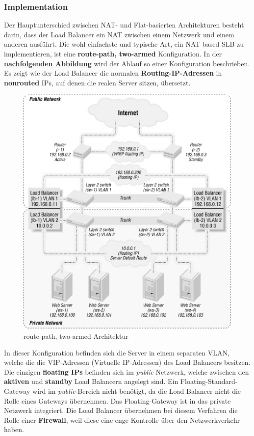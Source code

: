 \subsubsection{Implementation}
Der Hauptunterschied zwischen NAT- und Flat-basierten Architekturen besteht darin, dass der Load Balancer ein NAT zwischen einem Netzwerk und einem anderen ausführt. Die wohl einfachste und typische Art, ein NAT based SLB zu implementieren, ist eine 
\textbf{route-path, two-armed} Konfiguration. In der \textbf{\hyperref[nat_slb_01]{nachfolgenden Abbildung}} wird der Ablauf so einer Konfiguration beschrieben. Es zeigt wie der Load Balancer die normalen \textbf{Routing-IP-Adressen} in \textbf{nonrouted} IPs, auf denen die realen Server sitzen, übersetzt.
\begin{figure}[!h]
	\begin{center}
		\includegraphics[width=0.5\linewidth]{images/slb_0701}
		\caption{route-path, two-armed Architektur}
		\label{nat_slb_01}
	\end{center}
\end{figure}
\newline
In dieser Konfiguration befinden sich die Server in einem separaten VLAN, welche die die VIP-Adressen (Virtuelle IP-Adressen) des Load Balancers besitzen. Die einzigen \textbf{floating IPs} befinden sich im \textit{public} Netzwerk, welche zwischen den \textbf{aktiven} und \textbf{standby} Load Balancern angelegt sind. Ein Floating-Standard-Gateway wird im \textit{public}-Bereich nicht benötigt, da die Load Balancer nicht die Rolle eines Gateways übernehmen. Das Floating-Gateway ist in das private Netzwerk integriert. Die Load Balancer übernehmen bei diesem Verfahren die Rolle einer \textbf{Firewall}, weil diese eine enge Kontrolle über den Netzwerkverkehr haben.

